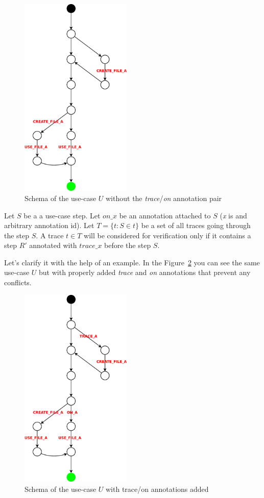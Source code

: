 \begin{figure}[ht]
  \centering
  \includegraphics[width=150pt]{images/traceTest_no_trace}
  \caption{Schema of the use-case $U$ without the \emph{trace}/\emph{on} annotation pair}
  \label{fig:traceTest_no_trace}
\end{figure}


\begin{definition}
	Let $S$ be a a use-case step.
	Let $on\_x$ be an annotation attached to $S$ (\emph{x} is and arbitrary annotation id).
	Let $T=\{t: S \in t\}$ be a set of all traces going through the step $S$.
	A trace $t \in T$ will be considered for verification only if it contains a step $R'$ annotated with $trace\_x$ before the step $S$.
\end{definition}

Let's clarify it with the help of an example.
In the Figure~\ref{fig:traceTest} you can see the same use-case $U$ but with properly added
\emph{trace} and \emph{on} annotations that prevent any conflicts.

\begin{figure}[ht]
  \centering
  \includegraphics[width=150pt]{images/traceTest}
  \caption{Schema of the use-case $U$ with trace/on annotations added}
  \label{fig:traceTest}
\end{figure}

